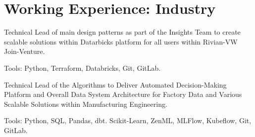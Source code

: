 \documentclass[]{template}
\begin{document}

\sectionsep%

\sectionsep
\section{Working Experience: Industry}

\sectionsep
{}

\vspace{\topsep}

\begin{tightemize}
\item Technical Lead of main design patterns as part of the Insights Team to create scalable solutions within Datarbicks platform for all users within Rivian-VW Join-Venture.

\item Tools: Python, Terraform, Databricks, Git, GitLab.
\end{tightemize}
\sectionsep

\sectionsep
{}

\vspace{\topsep}

\begin{tightemize}
\item Technical Lead of the Algorithms to Deliver Automated Decision-Making Platform and Overall Data System Architecture for Factory Data and Various Scalable Solutions within Manufacturing Engineering.

\item Tools: Python, SQL, Pandas, dbt. Scikit-Learn, ZenML, MLFlow, Kubeflow, Git, GitLab.
\end{tightemize}
\sectionsep


\sectionsep
{}
\end{document}

